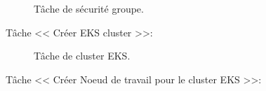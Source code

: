 {\begin{figure}[H]
\begin{center}
                   \end{center}
                   \caption{Tâche de sécurité groupe.}
                  \end{figure}
                  \indent
                   Tâche << Créer EKS cluster >>:
                   \begin{figure}[H]
                     \begin{center}
                     \end{center}
                     \caption{Tâche de cluster EKS.}
                    \end{figure}
                    \indent
                     Tâche << Créer Noeud de travail pour le cluster EKS >>:
                     \begin{figure}[H]
                       \begin{center}
                       \end{center}

\end{figure}}
